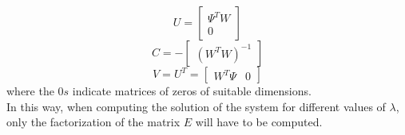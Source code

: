 \begin{equation*}
    U = 
    \begin{bmatrix}
        \Psi^TW\\
        0
    \end{bmatrix}
\end{equation*}
\begin{equation*}
    C = -
    \begin{bmatrix}
        \left(W^TW\right)^{-1}
    \end{bmatrix}
\end{equation*}
\begin{equation*}
    V = U^T =
    \begin{bmatrix}
        W^T\Psi & 0
    \end{bmatrix}
\end{equation*}
where the $0s$ indicate matrices of zeros of suitable dimensions.\\
In this way, when computing the solution of the system for different values of $\lambda$, only the factorization of the matrix $E$ will have to be computed.